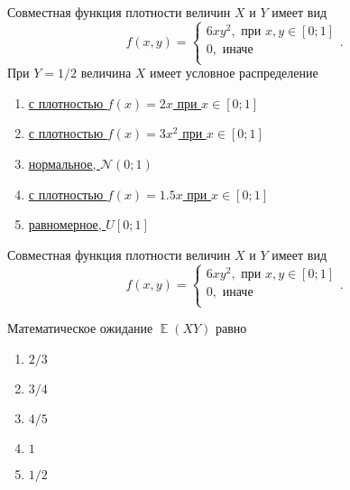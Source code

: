\documentclass[t]{beamer}
\DeclareMathOperator{\E}{\mathbb{E}}
\newcommand{\cN}{\mathcal{N}}
\begin{document}
 \begin{frame} \label{38} 
\begin{block}{38} 

Совместная функция плотности величин $X$ и $Y$ имеет вид
\[
f(x,y) =
\begin{cases}
6xy^2, \text{ при } x, y \in [0;1] \\
0, \text{ иначе } \\
\end{cases}.
\]
При $Y=1/2$ величина $X$ имеет условное распределение
  


 \end{block} 
\begin{enumerate} 
\item[] \hyperlink{38-Yes}{\beamergotobutton{}  с плотностью $f(x)=2x$ при $x\in[0;1]$ }
\item[] \hyperlink{38-No}{\beamergotobutton{}  с плотностью $f(x)=3x^2$ при $x\in[0;1]$ }
\item[] \hyperlink{38-No}{\beamergotobutton{}  нормальное, $\cN(0;1)$ }
\item[] \hyperlink{38-No}{\beamergotobutton{}  с плотностью $f(x)=1.5x$ при $x\in[0;1]$ }
\item[] \hyperlink{38-No}{\beamergotobutton{}  равномерное, $U[0;1]$ }
\end{enumerate} 
\end{frame} 


 \begin{frame} \label{39} 
\begin{block}{39} 

Совместная функция плотности величин $X$ и $Y$ имеет вид
\[
f(x,y) =
\begin{cases}
6xy^2, \text{ при } x, y \in [0;1] \\
0, \text{ иначе } \\
\end{cases}.
\]

Математическое ожидание $\E(XY)$ равно
  


 \end{block} 
\begin{enumerate} 
\item[] \hyperlink{39-No}{\beamergotobutton{}   $2/3$ }
\item[] \hyperlink{39-No}{\beamergotobutton{}  $3/4$ }
\item[] \hyperlink{39-No}{\beamergotobutton{}  $4/5$ }
\item[] \hyperlink{39-No}{\beamergotobutton{}  $1$ }
\item[] \hyperlink{39-Yes}{\beamergotobutton{}  $1/2$ }
\end{enumerate} 
\end{frame} 
\end{document}
